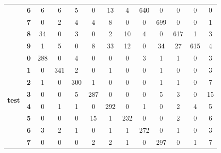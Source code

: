 \begin{table}[htp]
{\begin{tabular}{|c|c|c|c|c|c|c|c|c|c|c|c|c|}
		& \textbf{6} & 6          & 6          & 5          & 0          & 13         & 4          & 640        & 0          & 0          & 0          & 0                \\ \cline{2-13} 
		& \textbf{7} & 0          & 2          & 4          & 4          & 8          & 0          & 0          & 699        & 0          & 0          & 1                \\ \cline{2-13} 
		& \textbf{8} & 34         & 0          & 3          & 0          & 2          & 10         & 4          & 0          & 617        & 1          & 3                \\ \cline{2-13} 
		& \textbf{9} & 1          & 5          & 0          & 8          & 33         & 12         & 0          & 34         & 27         & 615        & 4                \\ \hline
		\multirow{10}{*}{\textbf{test}}     & \textbf{0} & 288        & 0          & 4          & 0          & 0          & 0          & 3          & 1          & 1          & 0          & 3                \\ \cline{2-13} 
		& \textbf{1} & 0          & 341        & 2          & 0          & 1          & 0          & 0          & 1          & 0          & 0          & 3                \\ \cline{2-13} 
		& \textbf{2} & 1          & 0          & 300        & 1          & 0          & 0          & 0          & 1          & 1          & 0          & 7                \\ \cline{2-13} 
		& \textbf{3} & 0          & 0          & 5          & 287        & 0          & 0          & 0          & 5          & 3          & 0          & 15               \\ \cline{2-13} 
		& \textbf{4} & 0          & 1          & 1          & 0          & 292        & 0          & 1          & 0          & 2          & 4          & 5                \\ \cline{2-13} 
		& \textbf{5} & 0          & 0          & 0          & 15         & 1          & 232        & 0          & 0          & 2          & 0          & 6                \\ \cline{2-13} 
		& \textbf{6} & 3          & 2          & 1          & 0          & 1          & 1          & 272        & 0          & 1          & 0          & 3                \\ \cline{2-13} 
		& \textbf{7} & 0          & 0          & 0          & 2          & 2          & 1          & 0          & 297        & 0          & 1          & 7                \\ \cline{2-13} 

\end{tabular}}
\end{table}
